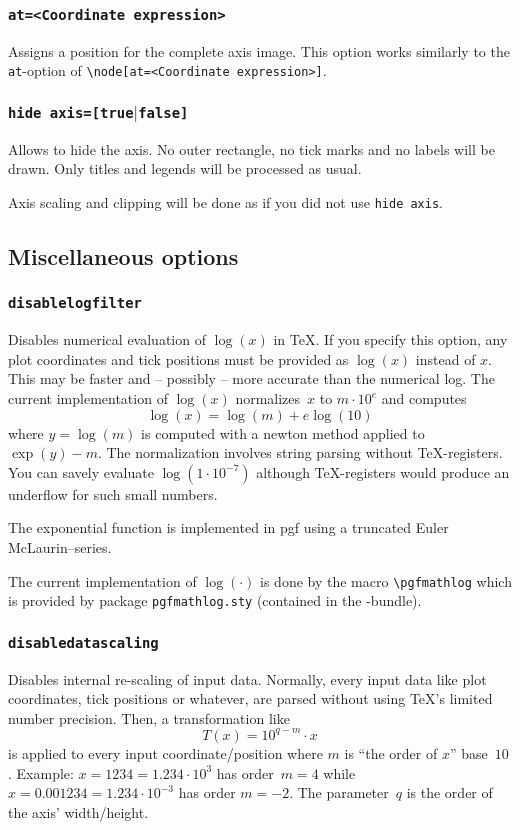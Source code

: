 \subsubsection{\texttt{at=<Coordinate expression>}}
Assigns a position for the complete axis image. This option works similarly to the \texttt{at}-option of \lstinline!\node[at=<Coordinate expression>]!.

\subsubsection{\texttt{hide axis=[true$|$false]}}
Allows to hide the axis. No outer rectangle, no tick marks and no labels will be drawn. Only titles and legends will be processed as usual.

Axis scaling and clipping will be done as if you did not use \texttt{hide axis}.




\subsection{Miscellaneous options}

\subsubsection{\texttt{disablelogfilter}}
Disables numerical evaluation of $\log(x)$ in \TeX. If you specify this option, any plot coordinates and tick positions must be provided as $\log(x)$ instead of $x$. This may be faster and -- possibly -- more accurate than the numerical log. The current implementation of $\log(x)$ normalizes~$x$ to $m\cdot 10^e$ and computes
\[ \log(x) = \log(m) + e \log(10) \]
where $y = \log(m)$ is computed with a newton method applied to $\exp(y) - m$. The normalization involves string parsing without \TeX-registers. You can savely evaluate $\log(1\cdot 10^{-7})$ although \TeX-registers would produce an underflow for such small numbers. 

The exponential function is implemented in pgf using a truncated Euler McLaurin--series.

The current implementation of $\log(\cdot)$ is done by the macro \lstinline!\pgfmathlog! which is provided by package \lstinline!pgfmathlog.sty! (contained in the \PGFPlots-bundle).

\subsubsection{\texttt{disabledatascaling}}
\label{sec:disabledatascaling}%
Disables internal re-scaling of input data. Normally, every input data like plot coordinates, tick positions or whatever, are parsed without using \TeX's limited number precision. Then, a transformation like 
	\[ T(x) = 10^{q-m} \cdot x \]
is applied to every input coordinate/position where $m$ is ``the order of $x$'' base~$10$. Example: $x=1234 = 1.234\cdot 10^3$ has order~$m=4$ while $x=0.001234 = 1.234\cdot 10^{-3}$ has order $m=-2$. The parameter~$q$ is the order of the axis' width/height.

